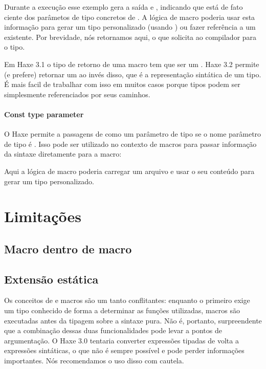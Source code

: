 \begin{itemize}
\begin{itemize}

Durante a execução esse exemplo gera a saída  e , indicando que está de fato ciente dos parâmetos de tipo concretos de . A lógica de macro poderia usar esta informação para gerar um tipo personalizado (usando ) ou fazer referência a um existente. Por brevidade, nós retornamos  aqui, o que solicita ao compilador para  o tipo.

Em Haxe 3.1 o tipo de retorno de uma macro  tem que ser um . Haxe 3.2 permite (e prefere) retornar um  ao invés disso, que é a representação sintática de um tipo. É mais facil de trabalhar com isso em muitos casos porque tipos podem ser simplesmente referenciados por seus caminhos.

\paragraph{Const type parameter}

O Haxe permite a passagens de  como um parâmetro de tipo se o nome parâmetro de tipo é . Isso pode ser utilizado no contexto de macros  para passar informação da sintaxe diretamente para a macro:


Aqui a lógica de macro poderia carregar um arquivo e usar o seu conteúdo para gerar um tipo personalizado.


\section{Limitações}
\label{macro-limitations}

\subsection{Macro dentro de macro}
\label{macro-limitations-macro-in-macro}

\subsection{Extensão estática}
\label{macro-limitations-static-extension}

Os conceitos de  e macros são um tanto conflitantes: enquanto o primeiro exige um tipo conhecido de forma a determinar as funções utilizadas, macros são executadas antes da tipagem sobre a sintaxe pura. Não é, portanto, surpreendente que a combinação dessas duas funcionalidades pode levar a pontos de argumentação. O Haxe 3.0 tentaria converter expressões tipadas de volta a expressões sintáticas, o que não é sempre possível e pode perder informações importantes. Nós recomendamos o uso disso com cautela.


\end{itemize}
\end{itemize}
